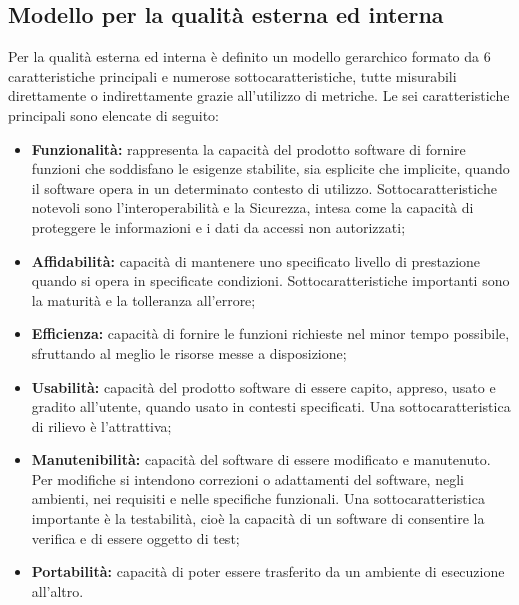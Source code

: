 \subsection{Modello per la qualità esterna ed interna}
Per la qualità esterna ed interna è definito un modello gerarchico formato da 6 caratteristiche principali e numerose sottocaratteristiche, tutte misurabili direttamente o indirettamente grazie all'utilizzo di metriche.
Le sei caratteristiche principali sono elencate di seguito:
\begin{itemize}
	\item \textbf{Funzionalità:} rappresenta la capacità del prodotto software di fornire funzioni che soddisfano le esigenze stabilite, sia esplicite che implicite, quando il software opera in un determinato contesto di utilizzo. Sottocaratteristiche notevoli sono l'interoperabilità e la Sicurezza, intesa come la capacità di proteggere le informazioni e i dati da accessi non autorizzati;
	\item \textbf{Affidabilità:} capacità di mantenere uno specificato livello di prestazione quando si opera in specificate condizioni. Sottocaratteristiche importanti sono la maturità e la tolleranza all'errore;
	\item \textbf{Efficienza:} capacità di fornire le funzioni richieste nel minor tempo possibile, sfruttando al meglio le risorse messe a disposizione;
	\item \textbf{Usabilità:} capacità del prodotto software di essere capito, appreso, usato e gradito all'utente, quando usato in contesti specificati. Una sottocaratteristica di rilievo è l'attrattiva;
	\item \textbf{Manutenibilità:} capacità del software di essere modificato e manutenuto. Per modifiche si intendono correzioni o adattamenti del software, negli ambienti, nei requisiti e nelle specifiche funzionali. Una sottocaratteristica importante è la testabilità, cioè la capacità di un software di consentire la verifica e di essere oggetto di test;
	\item \textbf{Portabilità:} capacità di poter essere trasferito da un ambiente di esecuzione all'altro.
\end{itemize}
